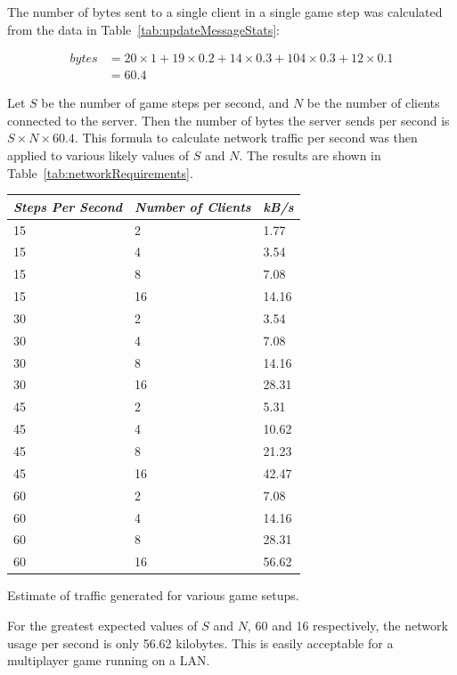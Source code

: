 The number of bytes sent to a single client in a single game step was calculated from the data in Table~\ref{tab:updateMessageStats}:

\begin{align*}
bytes &= 20 \times 1 + 19 \times 0.2 + 14 \times 0.3 + 104 \times 0.3 + 12 \times 0.1 \\
      &= 60.4
\end{align*}

Let $S$ be the number of game steps per second, and $N$ be the number of clients connected to the server. Then the number of bytes the server sends per second is $S \times N \times 60.4$. This formula to calculate network traffic per second was then applied to various likely values of $S$ and $N$. The results are shown in Table~\ref{tab:networkRequirements}.

\begin{margintable}
    \begin{tabular}{p{5em} p{5em} p{5em}}
    \toprule
    \emph{Steps Per Second} & \emph{Number of Clients} & \emph{kB/s} \\
    \midrule
    15 & 2 & 1.77 \\
    15 & 4 & 3.54 \\
    15 & 8 & 7.08 \\
    15 & 16 & 14.16 \\
    30 & 2 & 3.54 \\
    30 & 4 & 7.08 \\
    30 & 8 & 14.16 \\
    30 & 16 & 28.31 \\
    45 & 2 & 5.31 \\
    45 & 4 & 10.62 \\
    45 & 8 & 21.23 \\
    45 & 16 & 42.47 \\
    60 & 2 & 7.08 \\
    60 & 4 & 14.16 \\
    60 & 8 & 28.31 \\
    60 & 16 & 56.62 \\
    \bottomrule
    \end{tabular}
    	\vspace{1em}
	\caption[Estimation of network requirements]{
	Estimate of traffic generated for various game setups.}
	\label{tab:networkRequirements}
\end{margintable}

For the greatest expected values of $S$ and $N$, 60 and 16 respectively, the network usage per second is only 56.62 kilobytes. This is easily acceptable for a multiplayer game running on a LAN.
